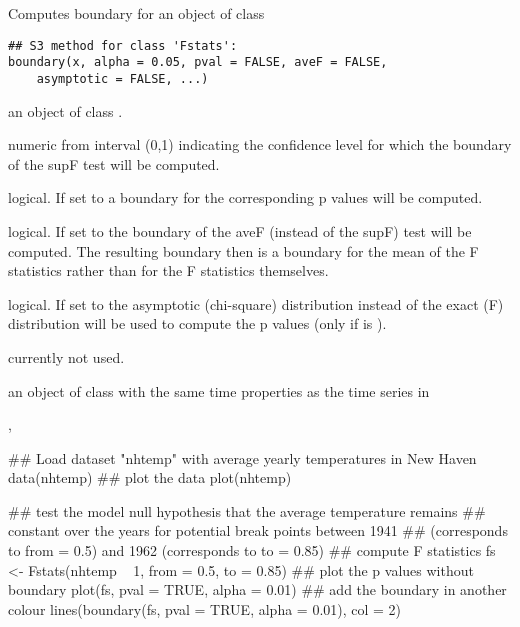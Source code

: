 \begin{Description}\relax
Computes boundary for an object of class \end{Description}
\begin{Usage}
\begin{verbatim}
## S3 method for class 'Fstats':
boundary(x, alpha = 0.05, pval = FALSE, aveF = FALSE,
    asymptotic = FALSE, ...)\end{verbatim}
\end{Usage}
\begin{Arguments}
\begin{ldescription}
\item[\code{x}] an object of class .
\item[\code{alpha}] numeric from interval (0,1) indicating the confidence level for
which the boundary of the supF test will be computed.
\item[\code{pval}] logical. If set to  a boundary for the corresponding p
values will be computed.
\item[\code{aveF}] logical. If set to  the boundary of the aveF (instead of
the supF) test will be computed. The resulting boundary then is a boundary
for the mean of the F statistics rather than for the F statistics
themselves.
\item[\code{asymptotic}] logical. If set to  the asymptotic (chi-square)
distribution instead of the exact (F) distribution will be used to compute
the p values (only if  is ).
\item[\code{...}] currently not used.
\end{ldescription}
\end{Arguments}
\begin{Value}
an object of class  with the same time properties as
the time series in \end{Value}
\begin{SeeAlso}\relax
{}, \end{SeeAlso}
\begin{Examples}
\begin{ExampleCode}
## Load dataset "nhtemp" with average yearly temperatures in New Haven
data(nhtemp)
## plot the data
plot(nhtemp)

## test the model null hypothesis that the average temperature remains
## constant over the years for potential break points between 1941
## (corresponds to from = 0.5) and 1962 (corresponds to to = 0.85)
## compute F statistics
fs <- Fstats(nhtemp ~ 1, from = 0.5, to = 0.85)
## plot the p values without boundary
plot(fs, pval = TRUE, alpha = 0.01)
## add the boundary in another colour
lines(boundary(fs, pval = TRUE, alpha = 0.01), col = 2)
\end{ExampleCode}
\end{Examples}

